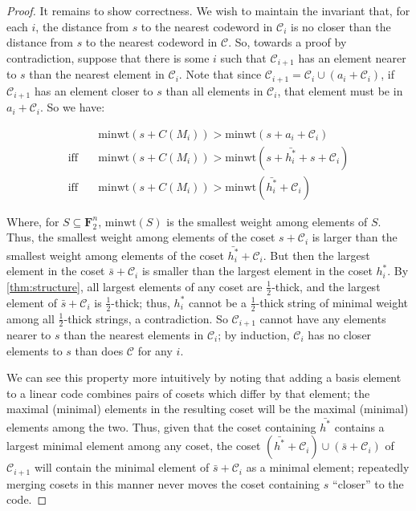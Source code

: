 \documentclass{article}
\newcommand{\FF}{\mathbf{F}}
\newcommand{\calC}{\mathcal{C}}
\newcommand{\minwt}{\text{minwt}}
\begin{document}
\begin{proof}
It remains to show correctness. We wish to maintain the invariant that, for each $i$, the distance from $s$ to the nearest codeword in $\calC_i$ is no closer than the distance from $s$ to the nearest codeword in $\calC$. So, towards a proof by contradiction, suppose that there is some $i$ such that $\calC_{i+1}$ has an element nearer to $s$ than the nearest element in $\calC_i$. Note that since $\calC_{i+1} = \calC_i \cup (a_i + \calC_i)$, if $\calC_{i+1}$ has an element closer to $s$ than all elements in $\calC_i$, that element must be in $a_i + \calC_i$. So we have:

\begin{align*}
    &\minwt(s + C(M_i)) > \minwt(s + a_i + \calC_i)\\
    \text{iff}\quad &\minwt(s + C(M_i)) > \minwt(s + \bar{h^*_i} + s + \calC_i)\\
    \text{iff}\quad &\minwt(s + C(M_i)) > \minwt(\bar{h^*_i} + \calC_i)
\end{align*}

Where, for $S \subseteq \FF_2^n$, $\minwt(S)$ is the smallest weight among elements of $S$. Thus, the smallest weight among elements of the coset $s + \calC_i$ is larger than the smallest weight among elements of the coset $\bar{h^*_i} + \calC_i$. But then the largest element in the coset $\bar{s}+\calC_i$ is smaller than the largest element in the coset $h^*_i$. By \cref{thm:structure}, all largest elements of any coset are $\frac12$-thick, and the largest element of $\bar{s}+\calC_i$ is $\frac12$-thick; thus, $h^*_i$ cannot be a $\frac12$-thick string of minimal weight among all $\frac12$-thick strings, a contradiction. So $\calC_{i+1}$ cannot have any elements nearer to $s$ than the nearest elements in $\calC_i$; by induction, $\calC_i$ has no closer elements to $s$ than does $\calC$ for any $i$.

We can see this property more intuitively by noting that adding a basis element to a linear code combines pairs of cosets which differ by that element; the maximal (minimal) elements in the resulting coset will be the maximal (minimal) elements among the two. Thus, given that the coset containing $\bar{h^*}$ contains a largest minimal element among any coset, the coset $(\bar{h^*} + \calC_i) \cup (\bar{s}+\calC_i)$ of $\calC_{i+1}$ will contain the minimal element of $\bar{s}+\calC_i$ as a minimal element; repeatedly merging cosets in this manner never moves the coset containing $s$ ``closer'' to the code.


\end{proof}
\end{document}
